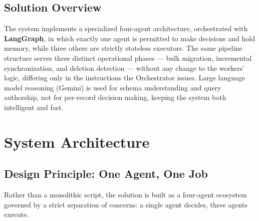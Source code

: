 \documentclass[11pt,a4paper]{article}
\begin{document}
\subsection{Solution Overview}
The system implements a specialized four-agent architecture, orchestrated with \textbf{LangGraph}, in which exactly one agent is permitted to make decisions and hold memory, while three others are strictly stateless executors. The same pipeline structure serves three distinct operational phases --- bulk migration, incremental synchronization, and deletion detection --- without any change to the workers' logic, differing only in the instructions the Orchestrator issues. Large language model reasoning (Gemini) is used for schema understanding and query authorship, not for per-record decision making, keeping the system both intelligent and fast.

\newpage
\section{System Architecture}

\subsection{Design Principle: One Agent, One Job}
Rather than a monolithic script, the solution is built as a four-agent ecosystem governed by a strict separation of concerns: a single agent decides, three agents execute.
\end{document}
